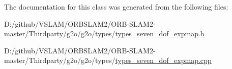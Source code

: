 The documentation for this class was generated from the following files\+:\begin{DoxyCompactItemize}
\item 
D\+:/github/\+V\+S\+L\+A\+M/\+O\+R\+B\+S\+L\+A\+M2/\+O\+R\+B-\/\+S\+L\+A\+M2-\/master/\+Thirdparty/g2o/g2o/types/\mbox{\hyperlink{types__seven__dof__expmap_8h}{types\+\_\+seven\+\_\+dof\+\_\+expmap.\+h}}\item 
D\+:/github/\+V\+S\+L\+A\+M/\+O\+R\+B\+S\+L\+A\+M2/\+O\+R\+B-\/\+S\+L\+A\+M2-\/master/\+Thirdparty/g2o/g2o/types/\mbox{\hyperlink{types__seven__dof__expmap_8cpp}{types\+\_\+seven\+\_\+dof\+\_\+expmap.\+cpp}}\end{DoxyCompactItemize}
